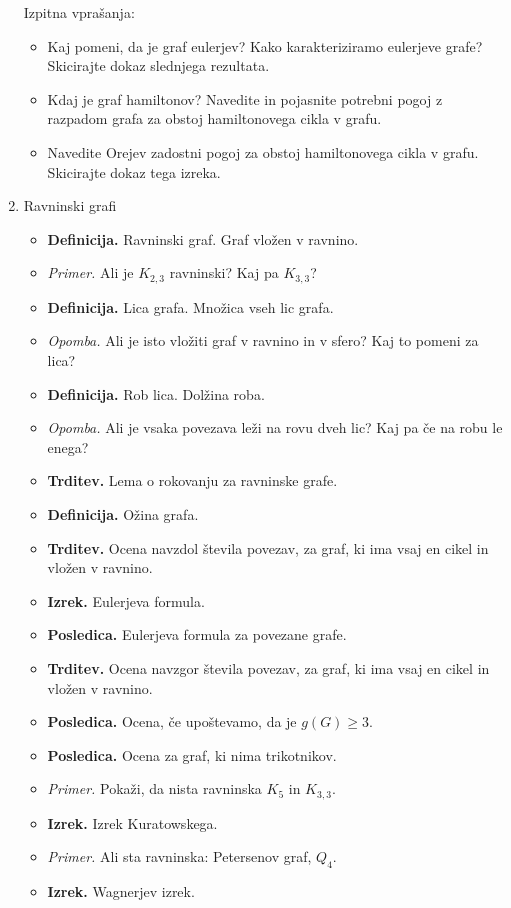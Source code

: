 \begin{enumerate}
    Izpitna vprašanja:
    \begin{itemize}
        \item Kaj pomeni, da je graf eulerjev? Kako karakteriziramo eulerjeve grafe? Skicirajte dokaz slednjega rezultata.
        \item Kdaj je graf hamiltonov? Navedite in pojasnite potrebni pogoj z razpadom grafa za obstoj hamiltonovega cikla v grafu.
        \item Navedite Orejev zadostni pogoj za obstoj hamiltonovega cikla v grafu. Skicirajte dokaz tega izreka.
    \end{itemize}  

    \item Ravninski grafi
    \begin{itemize}
        \item \colorbox{purple!30}{\textbf{Definicija.}} Ravninski graf. Graf vložen v ravnino.
        \item \colorbox{yellow!30}{\emph{Primer.}} Ali je \(K_{2,3}\) ravninski? Kaj pa \(K_{3,3}\)?
        \item \colorbox{purple!30}{\textbf{Definicija.}} Lica grafa. Množica vseh lic grafa.
        \item \colorbox{yellow!30}{\emph{Opomba.}} Ali je isto vložiti graf v ravnino in v sfero? Kaj to pomeni za lica?
        \item \colorbox{purple!30}{\textbf{Definicija.}} Rob lica. Dolžina roba. 
        \item \colorbox{yellow!30}{\emph{Opomba.}} Ali je vsaka povezava leži na rovu dveh lic? Kaj pa če na robu le enega?
        \item \colorbox{blue!30}{\textbf{Trditev.}} Lema o rokovanju za ravninske grafe.
        \item \colorbox{purple!30}{\textbf{Definicija.}} Ožina grafa.
        \item \colorbox{blue!30}{\textbf{Trditev.}} Ocena navzdol števila povezav, za graf, ki ima vsaj en cikel in vložen v ravnino.
        \item \colorbox{blue!30}{\textbf{Izrek.}} Eulerjeva formula.
        \item \colorbox{orange!30}{\textbf{Posledica.}} Eulerjeva formula za povezane grafe.
        \item \colorbox{blue!30}{\textbf{Trditev.}} Ocena navzgor števila povezav, za graf, ki ima vsaj en cikel in vložen v ravnino.
        \item \colorbox{orange!30}{\textbf{Posledica.}} Ocena, če upoštevamo, da je \(g(G) \geq 3\).
        \item \colorbox{orange!30}{\textbf{Posledica.}} Ocena za graf, ki nima trikotnikov.
        \item \colorbox{yellow!30}{\emph{Primer.}} Pokaži, da nista ravninska \(K_5\) in \(K_{3,3}\).
        \item \colorbox{blue!30}{\textbf{Izrek.}} Izrek Kuratowskega.
        \item \colorbox{yellow!30}{\emph{Primer.}} Ali sta ravninska: Petersenov graf, \(Q_4\).
        \item \colorbox{blue!30}{\textbf{Izrek.}} Wagnerjev izrek.
    \end{itemize}


\end{enumerate}
